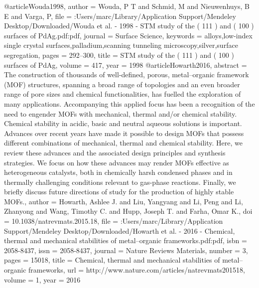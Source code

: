 @article{Wouda1998,
author = {Wouda, P T and Schmid, M and Nieuwenhuys, B E and Varga, P},
file = {:Users/marc/Library/Application Support/Mendeley Desktop/Downloaded/Wouda et al. - 1998 - STM study of the ( 111 ) and ( 100 ) surfaces of PdAg.pdf:pdf},
journal = {Surface Science},
keywords = {alloys,low-index single crystal surfaces,palladium,scanning tunneling microscopy,silver,surface segregation},
pages = {292--300},
title = {{STM study of the ( 111 ) and ( 100 ) surfaces of PdAg}},
volume = {417},
year = {1998}
}
@article{Howarth2016,
abstract = {The construction of thousands of well-defined, porous, metal–organic framework (MOF) structures, spanning a broad range of topologies and an even broader range of pore sizes and chemical functionalities, has fuelled the exploration of many applications. Accompanying this applied focus has been a recognition of the need to engender MOFs with mechanical, thermal and/or chemical stability. Chemical stability in acidic, basic and neutral aqueous solutions is important. Advances over recent years have made it possible to design MOFs that possess different combinations of mechanical, thermal and chemical stability. Here, we review these advances and the associated design principles and synthesis strategies. We focus on how these advances may render MOFs effective as heterogeneous catalysts, both in chemically harsh condensed phases and in thermally challenging conditions relevant to gas-phase reactions. Finally, we briefly discuss future directions of study for the production of highly stable MOFs.},
author = {Howarth, Ashlee J. and Liu, Yangyang and Li, Peng and Li, Zhanyong and Wang, Timothy C. and Hupp, Joseph T. and Farha, Omar K.},
doi = {10.1038/natrevmats.2015.18},
file = {:Users/marc/Library/Application Support/Mendeley Desktop/Downloaded/Howarth et al. - 2016 - Chemical, thermal and mechanical stabilities of metal–organic frameworks.pdf:pdf},
isbn = {2058-8437},
issn = {2058-8437},
journal = {Nature Reviews Materials},
number = {3},
pages = {15018},
title = {{Chemical, thermal and mechanical stabilities of metal–organic frameworks}},
url = {http://www.nature.com/articles/natrevmats201518},
volume = {1},
year = {2016}
}
